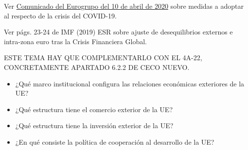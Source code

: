 \documentclass{nuevotema}
\begin{document}
\ideaclave

Ver \href{https://www.consilium.europa.eu/en/press/press-releases/2020/04/09/report-on-the-comprehensive-economic-policy-response-to-the-covid-19-pandemic/}{Comunicado del Eurogrupo del 10 de abril de 2020} sobre medidas a adoptar al respecto de la crisis del COVID-19.

Ver págs. 23-24 de IMF (2019) ESR sobre ajuste de desequilibrios externos e intra-zona euro tras la Crisis Financiera Global.

ESTE TEMA HAY QUE COMPLEMENTARLO CON EL 4A-22, CONCRETAMENTE APARTADO 6.2.2 DE CECO NUEVO.

\begin{itemize}
	\item ¿Qué marco institucional configura las relaciones económicas exteriores de la UE?
	\item ¿Qué estructura tiene el comercio exterior de la UE?
	\item ¿Qué estructura tiene la inversión exterior de la UE?
	\item ¿En qué consiste la política de cooperación al desarrollo de la UE?
\end{itemize}

\esquemacorto
\end{document}
